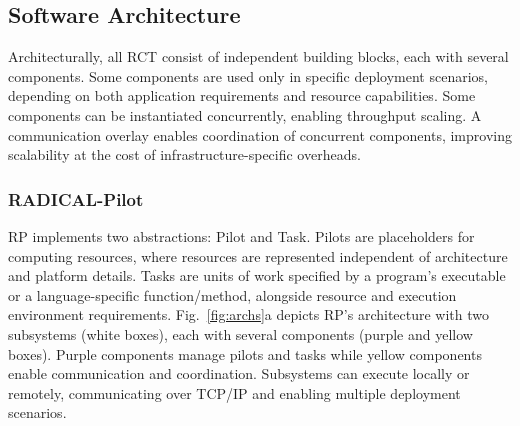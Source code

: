\documentclass[preprint,12pt, a4paper]{elsarticle}
\begin{document}
\subsection{Software Architecture}\label{ssec:architecture}


Architecturally, all RCT consist of independent building blocks, each with
several components. Some components are used only in specific deployment
scenarios, depending on both application requirements and resource capabilities.
Some components can be instantiated concurrently, enabling throughput scaling. A
communication overlay enables coordination of concurrent components, improving
scalability at the cost of infrastructure-specific overheads.

\subsubsection{RADICAL-Pilot}\label{sssec:arch_rp}

RP implements two abstractions: Pilot and Task. Pilots are placeholders for
computing resources, where resources are represented independent of architecture
and platform details. Tasks are units of work specified by a program's
executable or a language-specific function/method, alongside resource and
execution environment requirements. Fig.~\ref{fig:archs}a depicts RP's
architecture with two subsystems (white boxes), each with several components
(purple and yellow boxes). Purple components manage pilots and tasks while
yellow components enable communication and coordination. Subsystems can execute
locally or remotely, communicating over TCP/IP and enabling multiple deployment
scenarios.
\end{document}
